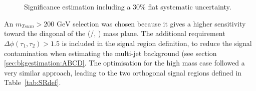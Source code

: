 \begin{figure}[h]
\centering
{}
 \\
\\
\caption{ Significance estimation including a $30 \%$ flat systematic uncertainty.\label{fig:app:LMgridstudies}}
\end{figure}

An $m_{Tsum} > 200 \text{ GeV}$ selection was chosen because it gives a higher sensitivity toward the diagonal of the (\Cone/\Ntwo, \None) mass plane.
The additional requirement $\Delta\phi(\tau_1,\tau_2) > 1.5$ is included in the signal region definition,  to reduce the signal contamination when estimating the multi-jet background (see section \ref{sec:bkgestimation:ABCD}.
The optimisation for the high mass case followed a very similar approach, leading to the two orthogonal signal regions defined in Table~\ref{tab:SRdef}.



